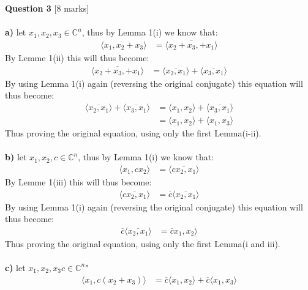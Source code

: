 \documentclass[11pt]{article}
\begin{document}
\textbf{Question 3} [8 marks] \\\\
\textbf{a)} let $x_1, x_2, x_3 \in \mathbb{C}^n$, thus by Lemma 1(i) we know that:
\begin{align*}
\langle x_1, x_2 + x_3  \rangle &= \langle \overline{x_2 + x_3, + x_1}  \rangle
\end{align*}
By Lemme 1(ii) this will thus become:
\begin{align*}
\langle \overline{x_2 + x_3, + x_1}  \rangle &= \langle \overline{x_2, x_1}  \rangle + \langle \overline{x_3,  x_1}  \rangle
\end{align*}
By using Lemma 1(i) again (reversing the original conjugate) this equation will thus become:
\begin{align*}
\langle \overline{x_2, x_1}  \rangle + \langle \overline{x_3, x_1}  \rangle &= \langle x_1, x_2  \rangle + \langle \overline{x_3,  x_1}  \rangle \\
&= \langle x_1, x_2  \rangle + \langle x_1, x_3  \rangle
\end{align*}
Thus proving the original equation, using only the first Lemma(i-ii).\\\\
\textbf{b)} let $x_1, x_2, c \in \mathbb{C}^n$, thus by Lemma 1(i) we know that:
\begin{align*}
\langle x_1, cx_2  \rangle &= \langle \overline{cx_2, x_1}  \rangle
\end{align*}
By Lemme 1(iii) this will thus become:
\begin{align*}
\langle \overline{cx_2, x_1}  \rangle &= \overline{c} \langle \overline{x_2, x_1}  \rangle
\end{align*}
By using Lemma 1(i) again (reversing the original conjugate) this equation will thus become:
\begin{align*}
\overline{c} \langle \overline{x_2, x_1}  \rangle &= \overline{c} x_1, x_2 \rangle
\end{align*}
Thus proving the original equation, using only the first Lemma(i and iii).\\\\
\textbf{c)} let $x_1, x_2, x_3 c \in \mathbb{C}^n$"
\begin{align*}
\langle x_1, c(x_2 +x_3)  \rangle &= \overline{c} \langle x_1, x_2  \rangle +  \overline{c} \langle x_1, x_3  \rangle
\end{align*}
\end{document}
